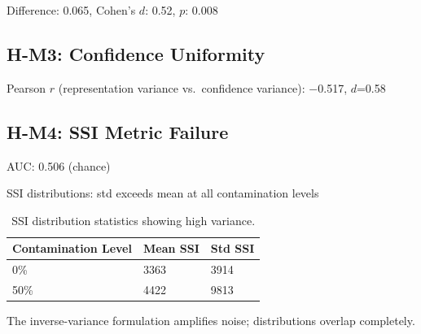 Difference: 0.065, Cohen's $d$: 0.52, $p$: 0.008

\subsection{H-M3: Confidence Uniformity}

Pearson $r$ (representation variance vs.\ confidence variance): $-$0.517, $d$=0.58

\subsection{H-M4: SSI Metric Failure}

AUC: 0.506 (chance)

SSI distributions: std exceeds mean at all contamination levels

\begin{table}[h]
\centering
\begin{tabular}{lll}
\toprule
Contamination Level & Mean SSI & Std SSI \\
\midrule
0\% & 3363 & 3914 \\
50\% & 4422 & 9813 \\
\bottomrule
\end{tabular}
\caption{SSI distribution statistics showing high variance.}
\label{tab:ssi}
\end{table}

The inverse-variance formulation amplifies noise; distributions overlap completely.
